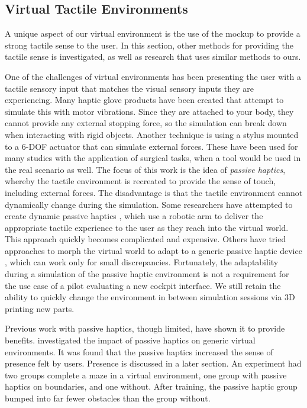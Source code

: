 \subsection{Virtual Tactile Environments}
\label{virtual-tactile-environments}

A unique aspect of our virtual environment is the use of the mockup to provide a strong tactile sense to the user.
In this section, other methods for providing the tactile sense is investigated, as well as research that uses similar methods to ours.

One of the challenges of virtual environments has been presenting the user with a tactile sensory input that matches the visual sensory inputs they are experiencing.
Many haptic glove products have been created that attempt to simulate this with motor vibrations.
Since they are attached to your body, they cannot provide any external stopping force, so the simulation can break down when interacting with rigid objects.
Another technique is using a stylus mounted to a 6-DOF actuator that can simulate external forces.
These have been used for many studies with the application of surgical tasks, when a tool would be used in the real scenario as well.
The focus of this work is the idea of \emph{passive haptics}, whereby the tactile environment is recreated to provide the sense of touch, including external forces.
The disadvantage is that the tactile environment cannot dynamically change during the simulation.
Some researchers have attempted to create dynamic passive haptics \citep{mcneely_robotic_1993, tachi_construction_1994}, which use a robotic arm to deliver the appropriate tactile experience to the user as they reach into the virtual world.
This approach quickly becomes complicated and expensive.
Others have tried approaches to morph the virtual world to adapt to a generic passive haptic device \citep{kohli_exploiting_2009,kohli_redirected_2012}, which can work only for small discrepancies.
Fortunately, the adaptability during a simulation of the passive haptic environment is not a requirement for the use case of a pilot evaluating a new cockpit interface.
We still retain the ability to quickly change the environment in between simulation sessions via 3D printing new parts.

Previous work with passive haptics, though limited, have shown it to provide benefits.
\citet{insko_passive_2001} investigated the impact of passive haptics on generic virtual environments.
It was found that the passive haptics increased the sense of presence felt by users.
Presence is discussed in a later section.
An experiment had two groups complete a maze in a virtual environment, one group with passive haptics on boundaries, and one without.
After training, the passive haptic group bumped into far fewer obstacles than the group without.

